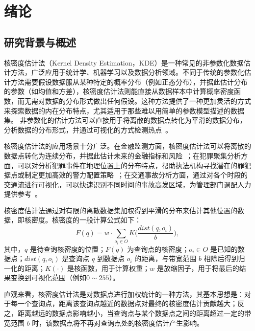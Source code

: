\chapter{绪论}

\section{研究背景与概述}

核密度估计法（Kernel Density Estimation，KDE）是一种常见的非参数化数据估计方法，广泛应用于统计学、机器学习以及数据分析领域。不同于传统的参数化估计方法需要假设数据服从某种特定的概率分布（例如正态分布），并据此估计分布的参数（如均值和方差），核密度估计法则能直接从数据样本中计算概率密度函数，而无需对数据的分布形式做出任何假设。这种方法提供了一种更加灵活的方式来探索数据的内在分布特点，尤其适用于那些难以用简单的参数模型描述的数据集。
非参数化的估计方法可以直接用于将离散的数据点转化为平滑的数据分布，分析数据的分布形式，并通过可视化的方式检测热点~\cite{silverman_density_2018, gramacki_nonparametric_2018}。

核密度估计法的应用场景十分广泛。在金融监测方面，核密度估计法可以将离散的数据点转化为连续分布，并据此估计未来的金融指标和风险~\cite{diebold_multivariate_1999, diebold_evaluating_1998, harvey_kernel_2012}；在犯罪聚集分析方面，可以对分析犯罪事件在地理位置上的分布特点，帮助执法机构寻找潜在的罪犯据点或制定更加高效的警力配置策略~\cite{brunsdon_visualising_2007, nakaya_visualising_2010, hart_kernel_2014}；在交通事故分析方面，通过对各个时段的交通流进行可视化，可以快速识别不同时间的事故高发区域，为管理部门调配人力提供参考~\cite{black_highway_1991, xie_kernel_2008, plug_spatial_2011}。

核密度估计法通过对有限的离散数据集加权得到平滑的分布来估计其他位置的数据，即核密度。核密度的一般计算公式如下：
\begin{equation}
	F(q) = w \cdot \sum_{o_i \in O} {K}\Big(\frac{dist(q, o_i)}{b}\Big),
\end{equation}
其中，$q$ 是待查询核密度的位置；$F(q)$ 为查询点的核密度；$o_i \in O$ 是已知的数据点；$dist(q,o_i)$ 是查询点 $q$ 到数据点 $o_i$ 的距离，与带宽范围 $b$ 相除后得到归一化的距离；$K(\cdot)$ 是核函数，用于计算权重；$w$ 是放缩因子，用于将最后的结果变换到可视化范围（例如$0 \sim 255$）。

直观来看，核密度估计法是对数据点进行加权统计的一种方法，其基本思想是：对于每一个查询点，距离该查询点越近的数据点对最终的核密度估计贡献越大；反之，距离越远的数据点影响越小，当查询点与某个数据点之间的距离超过一定的带宽范围 $b$ 时，该数据点将不再对查询点处的核密度估计产生影响。

